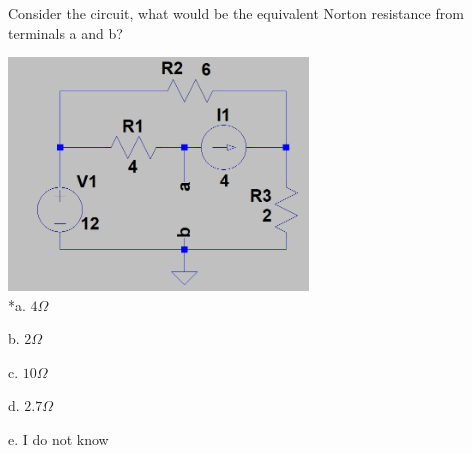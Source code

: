 
Consider the circuit, what would be the equivalent Norton resistance from terminals a and b?

\includegraphics[width=3.13021in,height=2.43461in]{../../Images/TheveninNortonQ3.png} \\


*a. \( 4 \Omega \)

b. \( 2 \Omega \)  

c. \( 10 \Omega \)

d. \( 2.7 \Omega \) 

e. I do not know \\
